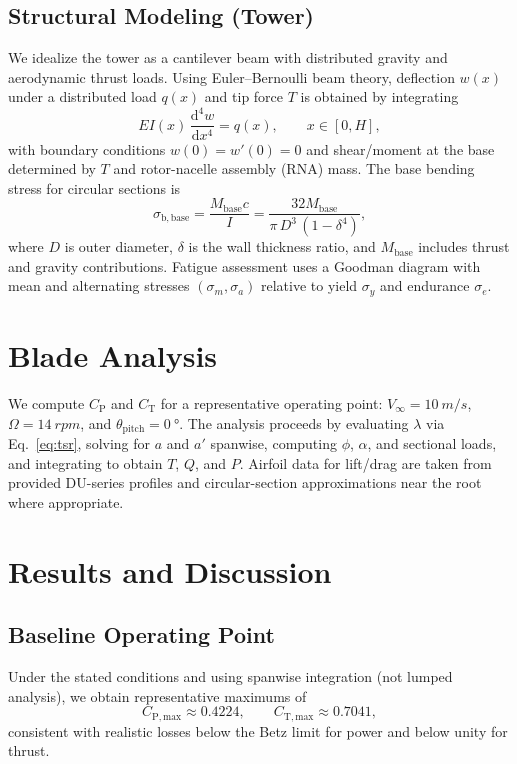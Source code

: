 \documentclass[11pt]{article}
\begin{document}
\subsection{Structural Modeling (Tower)}
We idealize the tower as a cantilever beam with distributed gravity and aerodynamic thrust loads. Using Euler--Bernoulli beam theory, deflection \(w(x)\) under a distributed load \(q(x)\) and tip force \(T\) is obtained by integrating
\begin{equation}
EI(x)\, \frac{\mathrm{d}^4 w}{\mathrm{d}x^4} = q(x), \qquad x\in[0,H],
\end{equation}
with boundary conditions \(w(0)=w'(0)=0\) and shear/moment at the base determined by \(T\) and rotor-nacelle assembly (RNA) mass. The base bending stress for circular sections is
\begin{equation}
\sigma_\mathrm{b,base} = \frac{M_\mathrm{base} c}{I} = \frac{32 M_\mathrm{base}}{\pi\, D^3\, (1-\delta^4)},
\end{equation}
where \(D\) is outer diameter, \(\delta\) is the wall thickness ratio, and \(M_\mathrm{base}\) includes thrust and gravity contributions. Fatigue assessment uses a Goodman diagram with mean and alternating stresses \((\sigma_m,\sigma_a)\) relative to yield \(\sigma_y\) and endurance \(\sigma_e\).

\section{Blade Analysis}
We compute \(C_\mathrm{P}\) and \(C_\mathrm{T}\) for a representative operating point: \(V_\infty = \SI{10}{m/s}\), \(\Omega = \SI{14}{rpm}\), and \(\theta_\mathrm{pitch} = \SI{0}{\degree}\). The analysis proceeds by evaluating \(\lambda\) via Eq.~\eqref{eq:tsr}, solving for \(a\) and \(a'\) spanwise, computing \(\phi\), \(\alpha\), and sectional loads, and integrating to obtain \(T\), \(Q\), and \(P\). Airfoil data for lift/drag are taken from provided DU-series profiles and circular-section approximations near the root where appropriate.

\section{Results and Discussion}
\subsection{Baseline Operating Point}
Under the stated conditions and using spanwise integration (not lumped analysis), we obtain representative maximums of
\begin{equation*}
C_\mathrm{P,max} \approx 0.4224, \qquad C_\mathrm{T,max} \approx 0.7041,
\end{equation*}
consistent with realistic losses below the Betz limit for power and below unity for thrust.
\end{document}
